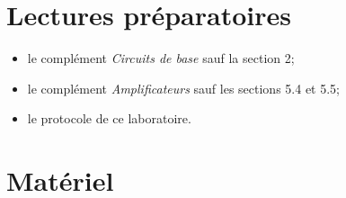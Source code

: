 \documentclass[canadien,12pt,oneside,letterpaper]{article}
\begin{document}

\section[Lectures préparatoires]{Lectures préparatoires} \label{sec:prep}

\begin{itemize} \itemsep4pt
\item le complément \textit{Circuits de base} sauf la section 2;
\item le complément \textit{Amplificateurs} sauf les sections 5.4 et 5.5;
\item le protocole de ce laboratoire.
\end{itemize}
\vspace{1ex}
\noindent{}

\section{Matériel}
\end{document}

